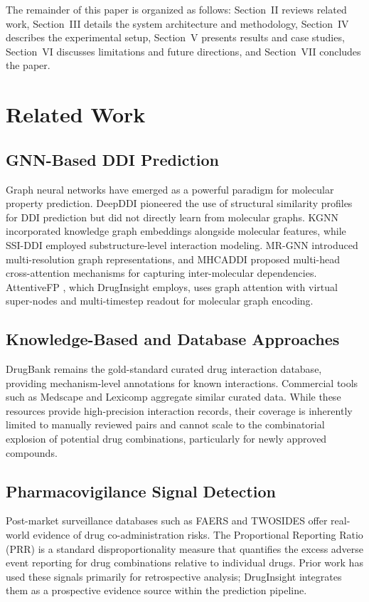 \documentclass[conference]{IEEEtran}
\begin{document}
The remainder of this paper is organized as follows: Section~II reviews related work, Section~III details the system architecture and methodology, Section~IV describes the experimental setup, Section~V presents results and case studies, Section~VI discusses limitations and future directions, and Section~VII concludes the paper.

\section{Related Work}

\subsection{GNN-Based DDI Prediction}
Graph neural networks have emerged as a powerful paradigm for molecular property prediction. DeepDDI \cite{deepddi2018} pioneered the use of structural similarity profiles for DDI prediction but did not directly learn from molecular graphs. KGNN \cite{kgnn2020} incorporated knowledge graph embeddings alongside molecular features, while SSI-DDI \cite{ssiddi2021} employed substructure-level interaction modeling. MR-GNN \cite{mrgnn2020} introduced multi-resolution graph representations, and MHCADDI \cite{mhcaddi2020} proposed multi-head cross-attention mechanisms for capturing inter-molecular dependencies. AttentiveFP \cite{xiong2020}, which DrugInsight employs, uses graph attention with virtual super-nodes and multi-timestep readout for molecular graph encoding.

\subsection{Knowledge-Based and Database Approaches}
DrugBank \cite{wishart2018} remains the gold-standard curated drug interaction database, providing mechanism-level annotations for known interactions. Commercial tools such as Medscape and Lexicomp aggregate similar curated data. While these resources provide high-precision interaction records, their coverage is inherently limited to manually reviewed pairs and cannot scale to the combinatorial explosion of potential drug combinations, particularly for newly approved compounds.

\subsection{Pharmacovigilance Signal Detection}
Post-market surveillance databases such as FAERS and TWOSIDES \cite{tatonetti2012} offer real-world evidence of drug co-administration risks. The Proportional Reporting Ratio (PRR) is a standard disproportionality measure that quantifies the excess adverse event reporting for drug combinations relative to individual drugs. Prior work has used these signals primarily for retrospective analysis; DrugInsight integrates them as a prospective evidence source within the prediction pipeline.
\end{document}
